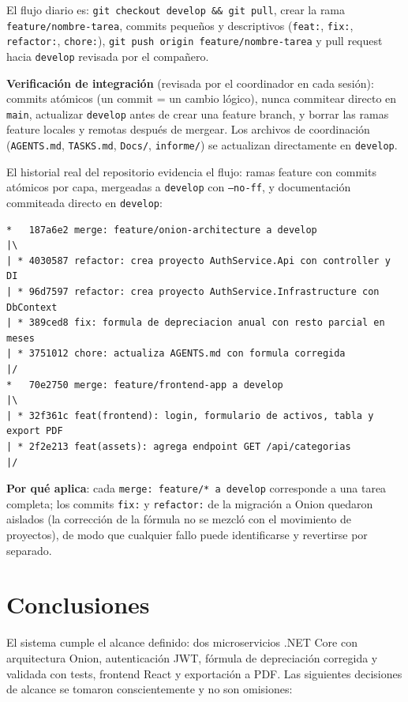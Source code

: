 \documentclass[11pt,a4paper]{article}
\begin{document}
El flujo diario es: \texttt{git checkout develop \&\& git pull}, crear la
rama \texttt{feature/nombre-tarea}, commits pequeños y descriptivos
(\texttt{feat:}, \texttt{fix:}, \texttt{refactor:}, \texttt{chore:}),
\texttt{git push origin feature/nombre-tarea} y pull request hacia
\texttt{develop} revisada por el compañero.

\textbf{Verificación de integración} (revisada por el coordinador en cada
sesión): commits atómicos (un commit = un cambio lógico), nunca commitear
directo en \texttt{main}, actualizar \texttt{develop} antes de crear una
feature branch, y borrar las ramas feature locales y remotas después de
mergear. Los archivos de coordinación (\texttt{AGENTS.md}, \texttt{TASKS.md},
\texttt{Docs/}, \texttt{informe/}) se actualizan directamente en
\texttt{develop}.

El historial real del repositorio evidencia el flujo: ramas feature con
commits atómicos por capa, mergeadas a \texttt{develop} con
\texttt{--no-ff}, y documentación commiteada directo en \texttt{develop}:

\begin{lstlisting}[style=json, caption={git log --oneline --graph (fragmento real)}]
*   187a6e2 merge: feature/onion-architecture a develop
|\
| * 4030587 refactor: crea proyecto AuthService.Api con controller y DI
| * 96d7597 refactor: crea proyecto AuthService.Infrastructure con DbContext
| * 389ced8 fix: formula de depreciacion anual con resto parcial en meses
| * 3751012 chore: actualiza AGENTS.md con formula corregida
|/
*   70e2750 merge: feature/frontend-app a develop
|\
| * 32f361c feat(frontend): login, formulario de activos, tabla y export PDF
| * 2f2e213 feat(assets): agrega endpoint GET /api/categorias
|/
\end{lstlisting}

\textbf{Por qué aplica}: cada \texttt{merge: feature/* a develop} corresponde
a una tarea completa; los commits \texttt{fix:} y \texttt{refactor:} de la
migración a Onion quedaron aislados (la corrección de la fórmula no se mezcló
con el movimiento de proyectos), de modo que cualquier fallo puede
identificarse y revertirse por separado.

\section{Conclusiones}

El sistema cumple el alcance definido: dos microservicios .NET Core con
arquitectura Onion, autenticación JWT, fórmula de depreciación corregida y
validada con tests, frontend React y exportación a PDF. Las siguientes
decisiones de alcance se tomaron conscientemente y no son omisiones:
\end{document}
